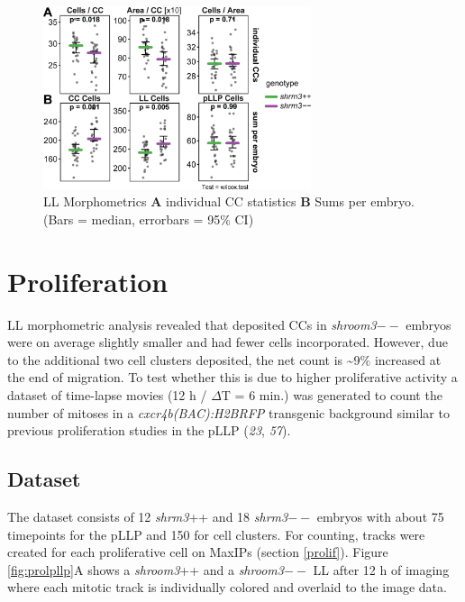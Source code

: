 \documentclass[11pt,singlespacinge,twoside]{reedthesis} %
\begin{document}
\begin{figure}

{\centering \includegraphics[width=0.7\textwidth]{figures/results/01_morphometrics/ll_clusters} 

}

\caption[LL Morphometrics]{LL Morphometrics \textbf{A} individual CC statistics \textbf{B} Sums per embryo. (Bars = median, errorbars = 95\% CI)}\label{fig:llclus}
\end{figure}
\hypertarget{proliferation}{%
\section{Proliferation}\label{proliferation}}

LL morphometric analysis revealed that deposited CCs in \emph{shroom3}\(--\) embryos were on average slightly smaller and had fewer cells incorporated. However, due to the additional two cell clusters deposited, the net count is \textasciitilde{}9\(\%\) increased at the end of migration.
To test whether this is due to higher proliferative activity a dataset of time-lapse movies (12 h / \(\Delta\)T = 6 min.) was generated to count the number of mitoses in a \emph{cxcr4b(BAC):H2BRFP} transgenic background similar to previous proliferation studies in the pLLP (\emph{23}, \emph{57}).

\hypertarget{dataset-1}{%
\subsection{Dataset}\label{dataset-1}}

The dataset consists of 12 \emph{shrm3}++ and 18 \emph{shrm3}\(--\) embryos with about 75 timepoints for the pLLP and 150 for cell clusters. For counting, tracks were created for each proliferative cell on MaxIPs (section \ref{prolif}). Figure \ref{fig:prolpllp}A shows a \emph{shroom3}++ and a \emph{shroom3}\(--\) LL after 12 h of imaging where each mitotic track is individually colored and overlaid to the image data.
\end{document}
